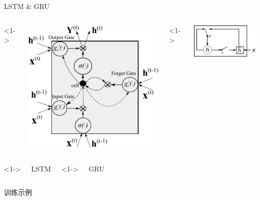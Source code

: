 \begin{xframe}{LSTM \& GRU}


    \begin{columns}
        <1->
        \begin{center}
            \includegraphics[width=\textwidth]{./style/images/LSTM_cell.pdf}
            
        \end{center}

        <1->
        \begin{center}
            \includegraphics[width=\textwidth]{./style/images/gru.pdf}
        \end{center}

    \end{columns}

    \begin{columns}
        <1->
        \begin{center}
            LSTM
        \end{center}

        <1->
        \begin{center}
            GRU
        \end{center}

    \end{columns}

\end{xframe}

\begin{xframe}{训练示例}


\end{xframe}